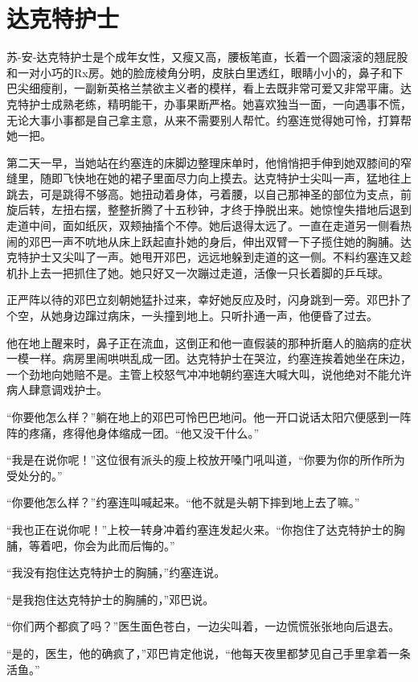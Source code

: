 \chapter{达克特护士}
 
    苏-安-达克特护士是个成年女性，又瘦又高，腰板笔直，长着一个圆滚滚的翘屁股和一对小巧的Rx房。她的脸庞棱角分明，皮肤白里透红，眼睛小小的，鼻子和下巴尖细瘦削，一副新英格兰禁欲主义者的模样，看上去既非常可爱又非常平庸。达克特护士成熟老练，精明能干，办事果断严格。她喜欢独当一面，一向遇事不慌，无论大事小事都是自己拿主意，从来不需要别人帮忙。约塞连觉得她可怜，打算帮她一把。

    第二天一早，当她站在约塞连的床脚边整理床单时，他悄悄把手伸到她双膝间的窄缝里，随即飞快地在她的裙子里面尽力向上摸去。达克特护士尖叫一声，猛地往上跳去，可是跳得不够高。她扭动着身体，弓着腰，以自己那神圣的部位为支点，前旋后转，左扭右摆，整整折腾了十五秒钟，才终于挣脱出来。她惊惶失措地后退到走道中间，面如纸灰，双颊抽搐个不停。她后退得太远了。一直在走道另一侧看热闹的邓巴一声不吭地从床上跃起直扑她的身后，伸出双臂一下子揽住她的胸脯。达克特护士又尖叫了一声。她甩开邓巴，远远地躲到走道的这一侧。不料约塞连又趁机扑上去一把抓住了她。她只好又一次蹦过走道，活像一只长着脚的乒乓球。

    正严阵以待的邓巴立刻朝她猛扑过来，幸好她反应及时，闪身跳到一旁。邓巴扑了个空，从她身边蹿过病床，一头撞到地上。只听扑通一声，他便昏了过去。

    他在地上醒来时，鼻子正在流血，这倒正和他一直假装的那种折磨人的脑病的症状一模一样。病房里闹哄哄乱成一团。达克特护士在哭泣，约塞连挨着她坐在床边，一个劲地向她赔不是。主管上校怒气冲冲地朝约塞连大喊大叫，说他绝对不能允许病人肆意调戏护士。

    “你要他怎么样？”躺在地上的邓巴可怜巴巴地问。他一开口说话太阳穴便感到一阵阵的疼痛，疼得他身体缩成一团。“他又没干什么。”

    “我是在说你呢！”这位很有派头的瘦上校放开嗓门吼叫道，“你要为你的所作所为受处分的。”

    “你要他怎么样？”约塞连叫喊起来。“他不就是头朝下摔到地上去了嘛。”

    “我也正在说你呢！”上校一转身冲着约塞连发起火来。“你抱住了达克特护士的胸脯，等着吧，你会为此而后悔的。”

    “我没有抱住达克特护士的胸脯，”约塞连说。

    “是我抱住达克特护士的胸脯的，”邓巴说。

    “你们两个都疯了吗？”医生面色苍白，一边尖叫着，一边慌慌张张地向后退去。

    “是的，医生，他的确疯了，”邓巴肯定他说，“他每天夜里都梦见自己手里拿着一条活鱼。”

